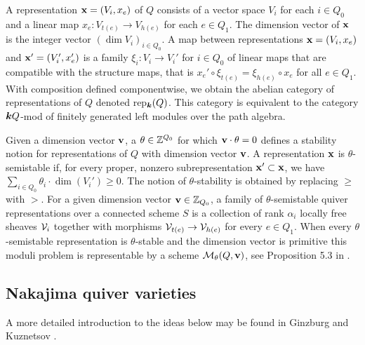 \documentclass{amsart}
\theoremstyle{definition}
\begin{document}
A representation $\mathbf{x} = (V_i, x_e)$ of $Q$ consists of a vector space $V_i$ for each $i \in Q_0$ and a linear map $x_e \colon V_{t(e)} \rightarrow V_{h(e)}$ for each $e \in Q_1$. 
The dimension vector of $\mathbf{x}$ is the integer vector $(\dim V_{i})_{i\in Q_0}$.  
A map between representations $\mathbf{x} = (V_i, x_e)$ and $\mathbf{x}' = (V_i', x_e')$ is a family $\xi_{i} \colon V_i^{\,} \rightarrow V_i'$ for $i \in Q_0$ of linear maps that are compatible with the structure maps, that is $x_e' \circ\xi_{t(e)} = \xi_{h(e)} \circ x_e$ for all $e \in Q_1$.  
With composition defined componentwise, we obtain the abelian category of representations of $Q$ denoted rep$_{\boldsymbol{k}}(Q)$. 
This category is equivalent to the category ${\boldsymbol{k}} Q$-mod of finitely generated left modules over the path algebra.

Given a dimension vector $\mathbf{v}$, a $\theta \in \mathbb{Z}^{Q_0}$ for which $\mathbf{v} \cdot \theta=0$ defines a stability notion for representations of $Q$ with dimension vector $\mathbf{v}$.
A representation $\mathbf{x}$ is $\theta$-semistable if, for every proper, nonzero subrepresentation $\mathbf{x}' \subset \mathbf{x}$, we have $\sum_{i \in Q_0} \theta_i \cdot \dim(V_i') \geq 0$.  
The notion of $\theta$-stability is obtained by replacing $\geq$ with $>$. 
For a given dimension vector $\mathbf{v} \in \mathbb{Z}_{Q_0}$, a family of $\theta$-semistable quiver representations over a connected scheme $S$ is a collection of rank $\alpha_i$ locally free sheaves $\mathcal{V}_i$ together with morphisms $\mathcal{V}_{t(e)} \rightarrow \mathcal{V}_{h(e)}$ for every $e\in Q_1$. 
When every $\theta$-semistable representation is $\theta$-stable and the dimension vector is primitive this moduli problem is representable by a scheme $\mathcal{M}_\theta(Q, \mathbf{v})$, see Proposition 5.3 in \cite{King}.

\subsection{Nakajima quiver varieties}\label{sc:back}
A more detailed introduction to the ideas below may be found in Ginzburg \cite{Ginzburg} and Kuznetsov \cite{Kuznetsov}.
\end{document}

